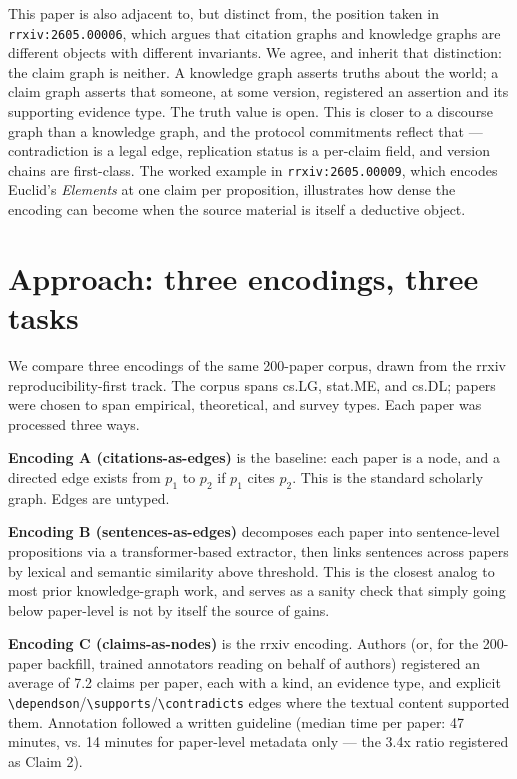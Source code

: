 \documentclass{rrxiv}
\begin{document}
This paper is also adjacent to, but distinct from, the position taken in \texttt{rrxiv:2605.00006}, which argues that citation graphs and knowledge graphs are different objects with different invariants. We agree, and inherit that distinction: the claim graph is neither. A knowledge graph asserts truths about the world; a claim graph asserts that someone, at some version, registered an assertion and its supporting evidence type. The truth value is open. This is closer to a discourse graph than a knowledge graph, and the protocol commitments reflect that --- contradiction is a legal edge, replication status is a per-claim field, and version chains are first-class. The worked example in \texttt{rrxiv:2605.00009}, which encodes Euclid's \emph{Elements} at one claim per proposition, illustrates how dense the encoding can become when the source material is itself a deductive object.

\section{Approach: three encodings, three tasks}

We compare three encodings of the same 200-paper corpus, drawn from the rrxiv reproducibility-first track. The corpus spans cs.LG, stat.ME, and cs.DL; papers were chosen to span empirical, theoretical, and survey types. Each paper was processed three ways.

\textbf{Encoding A (citations-as-edges)} is the baseline: each paper is a node, and a directed edge exists from $p_1$ to $p_2$ if $p_1$ cites $p_2$. This is the standard scholarly graph. Edges are untyped.

\textbf{Encoding B (sentences-as-edges)} decomposes each paper into sentence-level propositions via a transformer-based extractor, then links sentences across papers by lexical and semantic similarity above threshold. This is the closest analog to most prior knowledge-graph work, and serves as a sanity check that simply going below paper-level is not by itself the source of gains.

\textbf{Encoding C (claims-as-nodes)} is the rrxiv encoding. Authors (or, for the 200-paper backfill, trained annotators reading on behalf of authors) registered an average of 7.2 claims per paper, each with a kind, an evidence type, and explicit \texttt{\textbackslash dependson}/\texttt{\textbackslash supports}/\texttt{\textbackslash contradicts} edges where the textual content supported them. Annotation followed a written guideline (median time per paper: 47 minutes, vs. 14 minutes for paper-level metadata only --- the 3.4x ratio registered as Claim 2).
\end{document}
